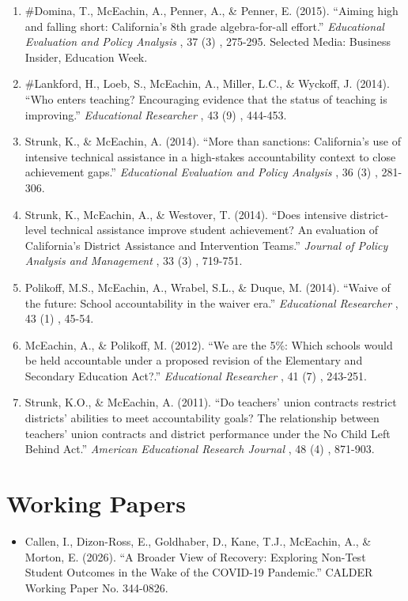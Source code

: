 \documentclass[11pt, letterpaper]{article}
\newcommand*{\revtotal}{0}
\newcommand*{\revarabic}[1]{\number\numexpr\revtotal + 1 - \value{#1}\relax}
\begin{document}
\begin{enumerate}[leftmargin=2em, label=\revarabic*.]
  \item \#Domina, T., McEachin, A., Penner, A., \& Penner, E. (2015).
  ``Aiming high and falling short: California's 8th grade algebra-for-all effort.''
  \textit{Educational Evaluation and Policy Analysis}%
, 37%
(3)%
, 275-295.
  Selected Media: Business Insider, Education Week.

  \item \#Lankford, H., Loeb, S., McEachin, A., Miller, L.C., \& Wyckoff, J. (2014).
  ``Who enters teaching? Encouraging evidence that the status of teaching is improving.''
  \textit{Educational Researcher}%
, 43%
(9)%
, 444-453.

  \item Strunk, K., \& McEachin, A. (2014).
  ``More than sanctions: California's use of intensive technical assistance in a high-stakes accountability context to close achievement gaps.''
  \textit{Educational Evaluation and Policy Analysis}%
, 36%
(3)%
, 281-306.

  \item Strunk, K., McEachin, A., \& Westover, T. (2014).
  ``Does intensive district-level technical assistance improve student achievement? An evaluation of California's District Assistance and Intervention Teams.''
  \textit{Journal of Policy Analysis and Management}%
, 33%
(3)%
, 719-751.

  \item Polikoff, M.S., McEachin, A., Wrabel, S.L., \& Duque, M. (2014).
  ``Waive of the future: School accountability in the waiver era.''
  \textit{Educational Researcher}%
, 43%
(1)%
, 45-54.

  \item McEachin, A., \& Polikoff, M. (2012).
  ``We are the 5\%: Which schools would be held accountable under a proposed revision of the Elementary and Secondary Education Act?.''
  \textit{Educational Researcher}%
, 41%
(7)%
, 243-251.

  \item Strunk, K.O., \& McEachin, A. (2011).
  ``Do teachers' union contracts restrict districts' abilities to meet accountability goals? The relationship between teachers' union contracts and district performance under the No Child Left Behind Act.''
  \textit{American Educational Research Journal}%
, 48%
(4)%
, 871-903.

\end{enumerate}

\section{Working Papers}
\begin{itemize}
  \item Callen, I., Dizon-Ross, E., Goldhaber, D., Kane, T.J., McEachin, A., \& Morton, E. (2026).
  ``A Broader View of Recovery: Exploring Non-Test Student Outcomes in the Wake of the COVID-19 Pandemic.''
CALDER Working Paper No. 344-0826. 
\end{itemize}
\end{document}
